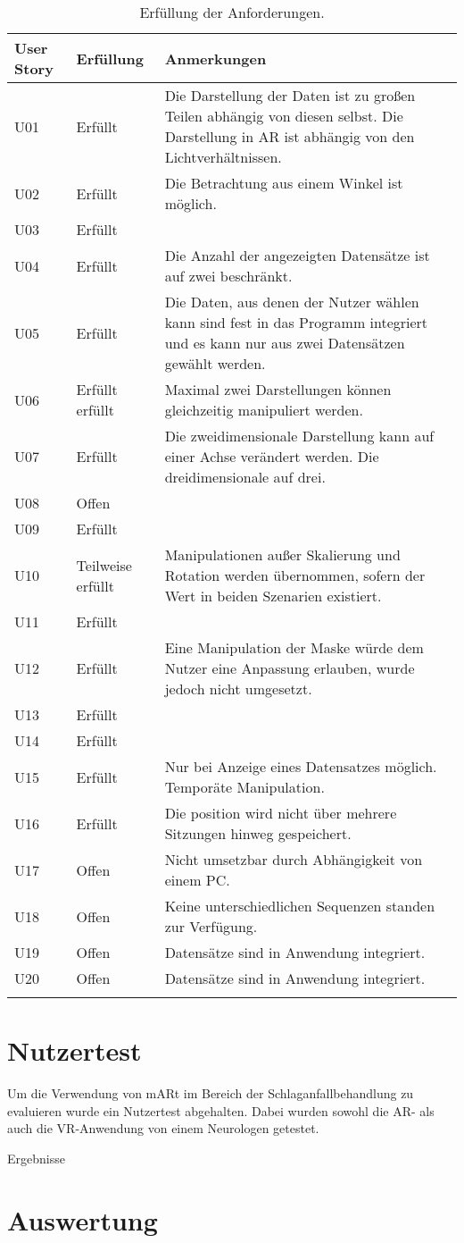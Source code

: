 \begin{longtable} {p{}p{}p{}}
\toprule
User Story & Erfüllung & Anmerkungen \\
\toprule
U01 & Erfüllt & Die Darstellung der Daten ist zu großen Teilen abhängig von diesen selbst. Die Darstellung in AR ist abhängig von den Lichtverhältnissen.\\
\midrule 
U02 & Erfüllt & Die Betrachtung aus einem Winkel ist möglich.\\
\midrule 
U03 & Erfüllt & \\
\midrule 
U04 & Erfüllt & Die Anzahl der angezeigten Datensätze ist auf zwei beschränkt.\\
\midrule 
U05 & Erfüllt & Die Daten, aus denen der Nutzer wählen kann sind fest in das Programm integriert und es kann nur aus zwei Datensätzen gewählt werden.\\
\midrule
U06 & Erfüllt erfüllt & Maximal zwei Darstellungen können gleichzeitig manipuliert werden. \\
\midrule 
U07 & Erfüllt & Die zweidimensionale Darstellung kann auf einer Achse verändert werden. Die dreidimensionale auf drei.\\
\midrule 
U08 & Offen & \\
\midrule 
U09 & Erfüllt & \\
\midrule 
U10 & Teilweise erfüllt & Manipulationen außer Skalierung und Rotation werden übernommen, sofern der Wert in beiden Szenarien existiert.\\
\midrule 
U11  & Erfüllt & \\
\midrule
U12 & Erfüllt & Eine Manipulation der Maske würde dem Nutzer eine Anpassung erlauben, wurde jedoch nicht umgesetzt.\\
\midrule 
U13 & Erfüllt & \\
\midrule 
U14 & Erfüllt & \\
\midrule 
U15 & Erfüllt & Nur bei Anzeige eines Datensatzes möglich. Temporäte Manipulation.\\
\midrule 
U16 & Erfüllt & Die position wird nicht über mehrere Sitzungen hinweg gespeichert.\\
\midrule 
U17 & Offen & Nicht umsetzbar durch Abhängigkeit von einem PC.\\
\midrule 
U18 & Offen & Keine unterschiedlichen Sequenzen standen zur Verfügung.\\
\midrule 
U19 & Offen & Datensätze sind in Anwendung integriert.\\
\midrule 
U20 & Offen & Datensätze sind in Anwendung integriert.\\

\bottomrule
\caption{\label{tab:evaluation}Erfüllung der Anforderungen.}
\end{longtable}

\section{Nutzertest}

Um die Verwendung von mARt im Bereich der Schlaganfallbehandlung zu evaluieren wurde ein Nutzertest abgehalten. 
Dabei wurden sowohl die AR- als auch die VR-Anwendung von einem Neurologen getestet. 

Ergebnisse

\section{Auswertung}
